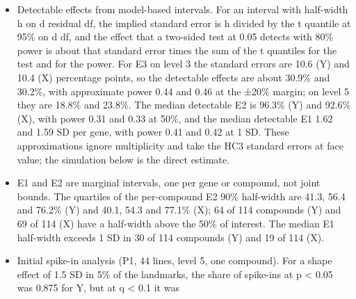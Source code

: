 \documentclass[
  11pt,
  letterpaper,
]{article}
\begin{document}
\begin{itemize}
  0.811 (p = 0.1424), with 11 compounds at p \textless{} 0.05 and 6 at q
  \textless{} 0.1 (AMG-232, daunorubicin, camptothecin, mitoxantrone,
  ceritinib and mitomycin-c), over 32 lines (21 mutant, 11 wild type) in
  7 lineages. The initial control panel gave p = 0.0039. Only 25 lines
  were shared, with consistent TP53 annotations across both sets.
  AMG-232 ranks 1 of 114 (p = 0.0004, q = 0.0228), with E2 −162.2\%
  (95\% CI −249.6 to −74.8), an on/off pharmacological effect. The
  pooled response-size difference for TP53 status, mutant minus wild
  type, is −4.5\% on level 3 (95\% CI −18.0 to 9.1) and −3.6\% on level
  5 (95\% CI −16.8 to 9.7), and −4.1\% on level 3 in the PC1 gate's line
  set (95\% CI −18.9 to 10.7). A known modifier of a handful of
  compounds thus moves the pooled response size by a few percent, far
  from the ±20\% margin; the panel-level test misses it on this line
  set, while the per-compound tests find it. In P1b and P2 the TP53
  panel p is 0.3490 and 0.1350.
\item
  Detectable effects from model-based intervals. For an interval with
  half-width h on d residual df, the implied standard error is h divided
  by the t quantile at 95\% on d df, and the effect that a two-sided
  test at 0.05 detects with 80\% power is about that standard error
  times the sum of the t quantiles for the test and for the power. For
  E3 on level 3 the standard errors are 10.6 (Y) and 10.4 (X) percentage
  points, so the detectable effects are about 30.9\% and 30.2\%, with
  approximate power 0.44 and 0.46 at the ±20\% margin; on level 5 they
  are 18.8\% and 23.8\%. The median detectable E2 is 96.3\% (Y) and
  92.6\% (X), with power 0.31 and 0.33 at 50\%, and the median
  detectable E1 1.62 and 1.59 SD per gene, with power 0.41 and 0.42 at 1
  SD. These approximations ignore multiplicity and take the HC3 standard
  errors at face value; the simulation below is the direct estimate.
\item
  E1 and E2 are marginal intervals, one per gene or compound, not joint
  bounds. The quartiles of the per-compound E2 90\% half-width are 41.3,
  56.4 and 76.2\% (Y) and 40.1, 54.3 and 77.1\% (X); 64 of 114 compounds
  (Y) and 69 of 114 (X) have a half-width above the 50\% of interest.
  The median E1 half-width exceeds 1 SD in 30 of 114 compounds (Y) and
  19 of 114 (X).
\item
  Initial spike-in analysis (P1, 44 lines, level 5, one compound). For a
  shape effect of 1.5 SD in 5\% of the landmarks, the share of spike-ins
  at p \textless{} 0.05 was 0.875 for Y, but at q \textless{} 0.1 it was

\end{itemize}
\end{document}
